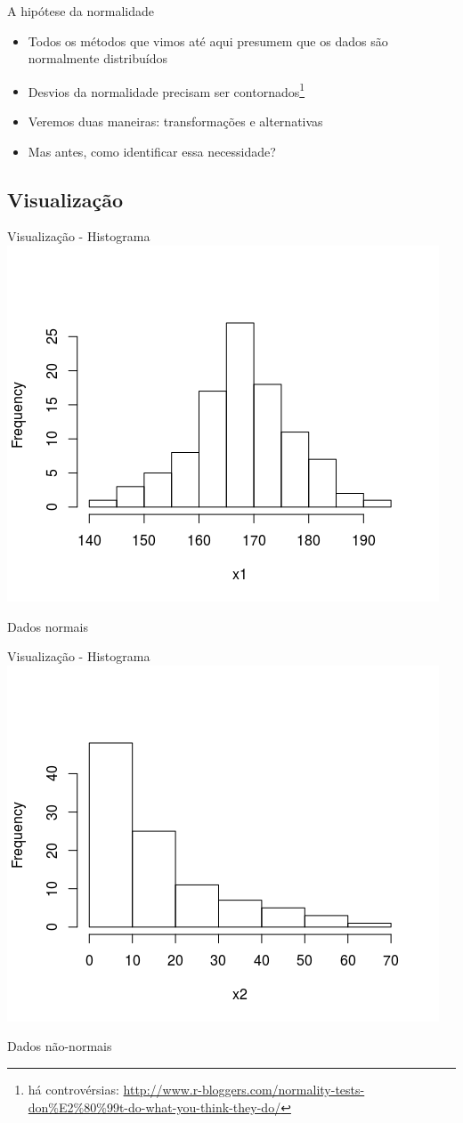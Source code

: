 \documentclass{beamer}
\begin{document}
\begin{frame}{A hipótese da normalidade}
  \begin{itemize}
  \item Todos os métodos que vimos até aqui presumem que os dados são normalmente distribuídos
  \item Desvios da normalidade precisam ser contornados\footnote{há controvérsias: \url{http://www.r-bloggers.com/normality-tests-don\%E2\%80\%99t-do-what-you-think-they-do/}}
  \item Veremos duas maneiras: transformações e alternativas
  \item Mas antes, como identificar essa necessidade?
  \end{itemize}

\end{frame}

\subsection{Visualização}

\begin{frame}{Visualização - Histograma}
  \centering
  \includegraphics[width=.7\textwidth]{Nao_Param/normal1-h}

  Dados normais
\end{frame}

\begin{frame}{Visualização - Histograma}
  \centering
  \includegraphics[width=.7\textwidth]{Nao_Param/lognormal1-h}

  Dados não-normais
\end{frame}
\end{document}
